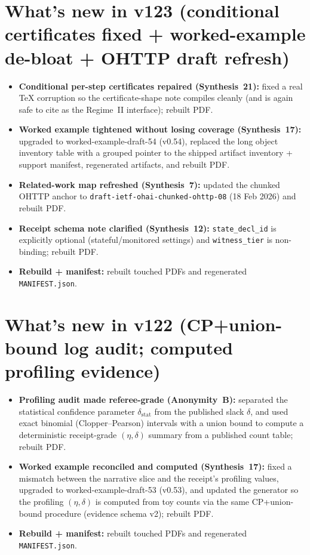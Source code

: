 \documentclass[11pt]{article}
\begin{document}
\section{What's new in v123 (conditional certificates fixed + worked-example de-bloat + OHTTP draft refresh)}
\begin{itemize}[leftmargin=*]
\item \textbf{Conditional per-step certificates repaired (Synthesis~21):} fixed a real TeX corruption so the certificate-shape note compiles cleanly (and is again safe to cite as the Regime~II interface); rebuilt PDF.
\item \textbf{Worked example tightened without losing coverage (Synthesis~17):} upgraded to worked-example-draft-54 (v0.54), replaced the long object inventory table with a grouped pointer to the shipped artifact inventory + support manifest, regenerated artifacts, and rebuilt PDF.
\item \textbf{Related-work map refreshed (Synthesis~7):} updated the chunked OHTTP anchor to \texttt{draft-ietf-ohai-chunked-ohttp-08} (18 Feb 2026) and rebuilt PDF.
\item \textbf{Receipt schema note clarified (Synthesis~12):} \texttt{state\_decl\_id} is explicitly optional (stateful/monitored settings) and \texttt{witness\_tier} is non-binding; rebuilt PDF.
\item \textbf{Rebuild + manifest:} rebuilt touched PDFs and regenerated \texttt{MANIFEST.json}.
\end{itemize}

\section{What's new in v122 (CP+union-bound log audit; computed profiling evidence)}
\begin{itemize}[leftmargin=*]
\item \textbf{Profiling audit made referee-grade (Anonymity~B):} separated the statistical confidence parameter $\delta_{\mathrm{stat}}$ from the published slack $\delta$, and used exact binomial (Clopper--Pearson) intervals with a union bound to compute a deterministic receipt-grade $(\eta,\delta)$ summary from a published count table; rebuilt PDF.
\item \textbf{Worked example reconciled and computed (Synthesis~17):} fixed a mismatch between the narrative slice and the receipt's profiling values, upgraded to worked-example-draft-53 (v0.53), and updated the generator so the profiling $(\eta,\delta)$ is computed from toy counts via the same CP+union-bound procedure (evidence schema v2); rebuilt PDF.
\item \textbf{Rebuild + manifest:} rebuilt touched PDFs and regenerated \texttt{MANIFEST.json}.
\end{itemize}
\end{document}
